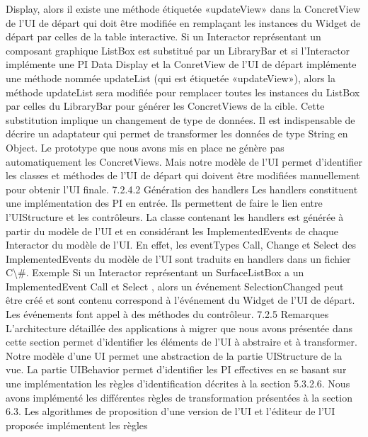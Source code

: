 \documentclass{article}
\begin{document}
Display, alors il existe une m\'{e}thode \'{e}tiquet\'{e}e «updateView» dans la ConcretView de l’UI de d\'{e}part
qui doit \^{e}tre modiﬁ\'{e}e en rempla\c{c}ant les instances du Widget de d\'{e}part par celles de la table interactive.
Si un Interactor repr\'{e}sentant un composant graphique ListBox est substitu\'{e} par un LibraryBar
et si l’Interactor impl\'{e}mente une PI Data Display et la ConretView de l’UI de d\'{e}part impl\'{e}mente
une m\'{e}thode nomm\'{e}e updateList (qui est \'{e}tiquet\'{e}e «updateView»), alors la m\'{e}thode updateList sera
modiﬁ\'{e}e pour remplacer toutes les instances du ListBox par celles du LibraryBar pour g\'{e}n\'{e}rer les
ConcretViews de la cible. Cette substitution implique un changement de type de donn\'{e}es. Il est indispensable de d\'{e}crire un adaptateur qui permet de transformer les donn\'{e}es de type String en Object.
Le prototype que nous avons mis en place ne g\'{e}n\`{e}re pas automatiquement les ConcretViews. Mais
notre mod\`{e}le de l’UI permet d’identiﬁer les classes et m\'{e}thodes de l’UI de d\'{e}part qui doivent \^{e}tre
modiﬁ\'{e}es manuellement pour obtenir l’UI ﬁnale.
7.2.4.2
G\'{e}n\'{e}ration des handlers
Les handlers constituent une impl\'{e}mentation des PI en entr\'{e}e. Ils permettent de faire le lien entre
l’UIStructure et les contr\^{o}leurs.
La classe contenant les handlers est g\'{e}n\'{e}r\'{e}e \`{a} partir du mod\`{e}le de l’UI et en consid\'{e}rant les
ImplementedEvents de chaque Interactor du mod\`{e}le de l’UI. En effet, les eventTypes Call, Change et
Select des ImplementedEvents du mod\`{e}le de l’UI sont traduits en handlers dans un ﬁchier C\textbackslash{}#.
Exemple
Si un Interactor repr\'{e}sentant un SurfaceListBox a un ImplementedEvent Call et Select ,
alors un \'{e}v\'{e}nement SelectionChanged peut \^{e}tre cr\'{e}\'{e} et sont contenu correspond \`{a} l’\'{e}v\'{e}nement du
Widget de l’UI de d\'{e}part. Les \'{e}v\'{e}nements font appel \`{a} des m\'{e}thodes du contr\^{o}leur.
7.2.5
Remarques
L’architecture d\'{e}taill\'{e}e des applications \`{a} migrer que nous avons pr\'{e}sent\'{e}e dans cette section
permet d’identiﬁer les \'{e}l\'{e}ments de l’UI \`{a} abstraire et \`{a} transformer. Notre mod\`{e}le d’une UI permet
une abstraction de la partie UIStructure de la vue. La partie UIBehavior permet d’identiﬁer les PI
effectives en se basant sur une impl\'{e}mentation les r\`{e}gles d’identiﬁcation d\'{e}crites \`{a} la section 5.3.2.6.
Nous avons impl\'{e}ment\'{e} les diff\'{e}rentes r\`{e}gles de transformation pr\'{e}sent\'{e}es \`{a} la section 6.3. Les
algorithmes de proposition d’une version de l’UI et l’\'{e}diteur de l’UI propos\'{e}e impl\'{e}mentent les r\`{e}gles
\end{document}
